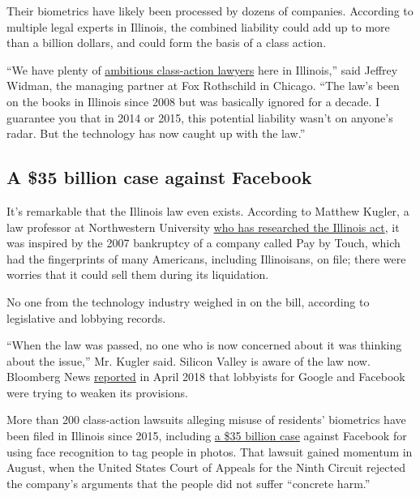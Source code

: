 Their biometrics have likely been processed by dozens of companies.
According to multiple legal experts in Illinois, the combined liability
could add up to more than a billion dollars, and could form the basis of
a class action.

``We have plenty of
\href{https://www.nytimes3xbfgragh.onion/2015/04/05/technology/unpopular-in-silicon-valley.html}{ambitious
class-action lawyers} here in Illinois,'' said Jeffrey Widman, the
managing partner at Fox Rothschild in Chicago. ``The law's been on the
books in Illinois since 2008 but was basically ignored for a decade. I
guarantee you that in 2014 or 2015, this potential liability wasn't on
anyone's radar. But the technology has now caught up with the law.''

\hypertarget{a-35-billion-case-against-facebook}{%
\subsection{A \$35 billion case against
Facebook}\label{a-35-billion-case-against-facebook}}

It's remarkable that the Illinois law even exists. According to Matthew
Kugler, a law professor at Northwestern University
\href{https://papers.ssrn.com/sol3/papers.cfm?abstract_id=3289850}{who
has researched the Illinois act}, it was inspired by the 2007 bankruptcy
of a company called Pay by Touch, which had the fingerprints of many
Americans, including Illinoisans, on file; there were worries that it
could sell them during its liquidation.

No one from the technology industry weighed in on the bill, according to
legislative and lobbying records.

``When the law was passed, no one who is now concerned about it was
thinking about the issue,'' Mr. Kugler said. Silicon Valley is aware of
the law now. Bloomberg News
\href{https://www.bloomberg.com/news/articles/2018-04-24/google-takes-aim-at-privacy-law-after-facebook-lobbying-failed}{reported}
in April 2018 that lobbyists for Google and Facebook were trying to
weaken its provisions.

More than 200 class-action lawsuits alleging misuse of residents'
biometrics have been filed in Illinois since 2015, including
\href{https://www.courthousenews.com/ninth-circuit-advances-35-billion-privacy-suit-against-facebook/}{a
\$35 billion case} against Facebook for using face recognition to tag
people in photos. That lawsuit gained momentum in August, when the
United States Court of Appeals for the Ninth Circuit rejected the
company's arguments that the people did not suffer ``concrete harm.''

